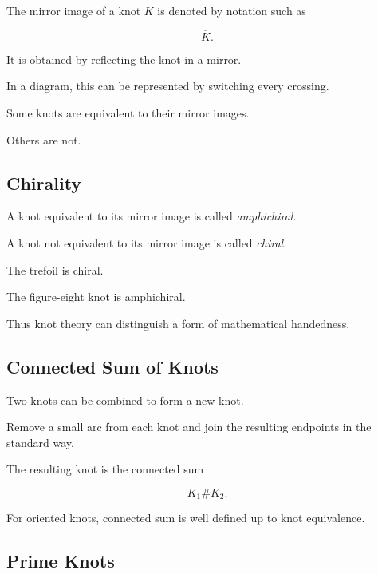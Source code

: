 The mirror image of a knot \(K\) is denoted by notation such as

\[
\boxed{
\overline{K}.
}
\]

It is obtained by reflecting the knot in a mirror.

In a diagram, this can be represented by switching every crossing.

Some knots are equivalent to their mirror images.

Others are not.

\subsection{Chirality}
\label{subsec:knot-chirality}

A knot equivalent to its mirror image is called \emph{amphichiral}.

A knot not equivalent to its mirror image is called \emph{chiral}.

The trefoil is chiral.

The figure-eight knot is amphichiral.

Thus knot theory can distinguish a form of mathematical handedness.

\subsection{Connected Sum of Knots}
\label{subsec:connected-sum-knots}

Two knots can be combined to form a new knot.

Remove a small arc from each knot and join the resulting endpoints in the
standard way.

The resulting knot is the connected sum

\[
\boxed{
K_1\#K_2.
}
\]

For oriented knots, connected sum is well defined up to knot equivalence.

\subsection{Prime Knots}
\label{subsec:prime-knots}

